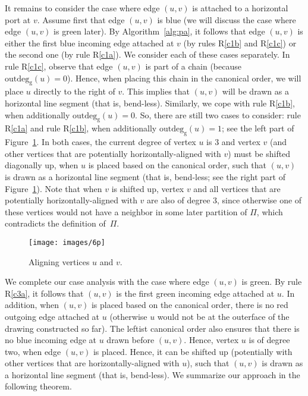 \documentclass[a4paper,twoside,11pt]{article}
\newcommand{\outdeg}[2]{\mathrm{outdeg}_{\mathrm{#1}}(#2)}
\begin{document}
It remains to consider the case where edge $(u,v)$ is attached to a
horizontal port at $v$. Assume first that edge $(u,v)$ is blue (we
will discuss the case where edge $(u,v)$ is green later). By
Algorithm~\ref{alg:pa}, it follows that edge $(u,v)$ is either the
first blue incoming edge attached at $v$ (by rules R\ref{c1b} and
R\ref{c1c}) or the second one (by rule R\ref{c1a}). We consider each
of these cases separately. In rule R\ref{c1c}, observe that edge
$(u,v)$ is part of a chain (because $\outdeg{g}{u}=0$). Hence, when
placing this chain in the canonical order, we will place $u$
directly to the right of $v$. This implies that $(u,v)$ will be
drawn as a horizontal line segment (that is, bend-less). Similarly,
we cope with rule R\ref{c1b}, when additionally $\outdeg{g}{u}=0$.
So, there are still two cases to consider: rule R\ref{c1a} and rule
R\ref{c1b}, when additionally $\outdeg{g}{u}=1$; see the left part
of Figure~\ref{fig:blueconfiguration}. In both cases, the current
degree of vertex $u$ is $3$ and vertex $v$ (and other vertices that
are potentially horizontally-aligned with $v$) must be shifted
diagonally up, when $u$ is placed based on the canonical order, such
that $(u,v)$ is drawn as a horizontal line segment (that is,
bend-less; see the right part of
Figure~\ref{fig:blueconfiguration}). Note that when $v$ is shifted
up, vertex $v$ and all vertices that are potentially
horizontally-aligned with $v$ are also of degree $3$, since
otherwise one of these vertices would not have a neighbor in some
later partition of $\Pi$, which contradicts the definition of~$\Pi$.

\begin{figure}[t!]
    \centering
    \texttt{[image: images/6p]}
    \caption{Aligning vertices $u$ and $v$.}
    \label{fig:blueconfiguration}
\end{figure}

We complete our case analysis with the case where edge $(u,v)$ is
green. By rule R\ref{c3a}, it follows that $(u,v)$ is the first
green incoming edge attached at $u$. In addition, when $(u,v)$ is
placed based on the canonical order, there is no red outgoing edge
attached at $u$ (otherwise $u$ would not be at the outerface of the
drawing constructed so far). The leftist canonical order also
ensures that there is no blue incoming edge at $u$ drawn before
$(u,v)$. Hence, vertex $u$ is of degree two, when edge $(u,v)$ is
placed. Hence, it can be shifted up (potentially with other vertices
that are horizontally-aligned with $u$), such that $(u,v)$ is drawn
as a horizontal line segment (that is, bend-less). We summarize our
approach in the following theorem.
\end{document}
